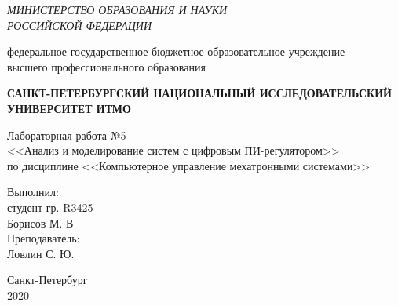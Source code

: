 \begin{titlepage}
	\begin{center}
		\textit{МИНИСТЕРСТВО ОБРАЗОВАНИЯ И НАУКИ\\
		РОССИЙСКОЙ ФЕДЕРАЦИИ}
		\vspace{1ex}
		
		федеральное государственное бюджетное образовательное учреждение\\
		высшего профессионального образования
		\vspace{1ex}
		
		\textbf{САНКТ-ПЕТЕРБУРГСКИЙ НАЦИОНАЛЬНЫЙ ИССЛЕДОВАТЕЛЬСКИЙ УНИВЕРСИТЕТ ИТМО}
		\vspace{10ex}
		
		Лабораторная работа №5\\
		<<Анализ и моделирование систем с цифровым ПИ-регулятором>>\\
		по дисциплине <<Компьютерное управление мехатронными системами>>\\
	\end{center}
	\vspace{15ex}
	\begin{flushright}
		\noindent
		Выполнил:\\
		студент гр. R3425\\
		Борисов М. В\\
		Преподаватель:\\
		Ловлин С. Ю.
	\end{flushright}
	\vfill
	\begin{center}
		\large Санкт-Петербург\\
		2020\\
	\end{center}
\end{titlepage}